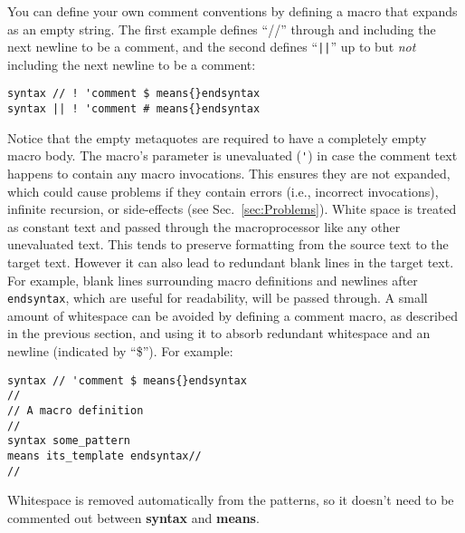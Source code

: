 \documentclass[12pt]{article}
\begin{document}
You can define your own comment conventions by defining a macro that expands as an empty string. The first example defines ``//'' through and including the next newline to be a comment,
and the second defines ``\lstinline+||+'' up to but \emph{not} including the next newline to be a comment:
\begin{lstlisting}[frame=single]
syntax // ! 'comment $ means{}endsyntax
syntax || ! 'comment # means{}endsyntax
\end{lstlisting}
Notice that the empty metaquotes are required to have a completely empty macro body. The macro's parameter is unevaluated (\verb+'+) in case the comment text happens to contain any macro invocations. This ensures they are not expanded, which could cause problems if they contain errors (i.e., incorrect invocations), infinite recursion, or side-effects (see Sec.\ \ref{sec:Problems}).
White space is treated as constant text and passed through the macroprocessor like any other unevaluated text. This tends to preserve formatting from the source text to the target text. However it can also lead to redundant blank lines in the target text. For example, blank lines surrounding macro definitions and newlines after \lstinline"endsyntax", which are useful for readability, will be passed through. A small amount of whitespace can be avoided by defining a comment macro, as described in the previous section, and using it to absorb redundant whitespace and an newline (indicated by ``\$''). For example:
\begin{lstlisting}[frame=single]
syntax // 'comment $ means{}endsyntax
//
// A macro definition
//
syntax some_pattern 
means its_template endsyntax//
//
\end{lstlisting}
Whitespace is removed automatically from the patterns, so it doesn't need to be commented out between \textbf{syntax} and \textbf{means}.
 
\end{document}
